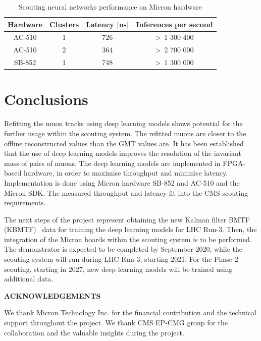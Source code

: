 \documentclass[10pt, paper=a4, UKenglish]{article}
\def\Acknowledgements{\bigskip  \bigskip \begin{center} \begin{large}
      \bf ACKNOWLEDGEMENTS \end{large}\end{center}}
\begin{document}
\begin{table}[!htb]
\setlength{\belowcaptionskip}{-20pt}
  \begin{center}
    \begin{tabular}{|c|c|c|c|}
      \hline
      Hardware & Clusters & Latency [ns] & Inferences per second \\
      \hline
      AC-510 & 1 & 726 & \textgreater~1 300 400 \\
      \hline
      AC-510 & 2 & 364 & \textgreater~2 700 000 \\
      \hline
      SB-852 & 1 & 748 & \textgreater~1 300 000 \\
      \hline
    \end{tabular}
    \caption{Scouting neural networks performance on Micron hardware}
    \label{tab:DLA_perf}
  \end{center}
\end{table}

\section{Conclusions}

Refitting the muon tracks using deep learning models shows potential for the further usage within the scouting system. The refitted muons are closer to the offline reconstructed values than the GMT values are. It has been established that the use of deep learning models improves the resolution of the invariant mass of pairs of muons. The deep learning models are implemented in FPGA-based hardware, in order to maximise throughput and minimise latency. Implementation is done using Micron hardware SB-852 and AC-510 and the Micron SDK. The measured throughput and latency fit into the CMS scouting requirements. 

The next steps of the project represent obtaining the new Kalman filter BMTF (KBMTF)~\cite{kbmtf} data for training the deep learning models for LHC Run-3. Then, the integration of the Micron boards within the scouting system is to be performed. The demonstrator is expected to be completed by September 2020, while the scouting system will run during LHC Run-3, starting 2021. For the Phase-2 scouting, starting in 2027, new deep learning models will be trained using additional data.

\Acknowledgements
We thank Micron Technology Inc. for the financial contribution and the technical support throughout the project. We thank CMS EP-CMG group for the collaboration and the valuable insights during the project.
\end{document}
